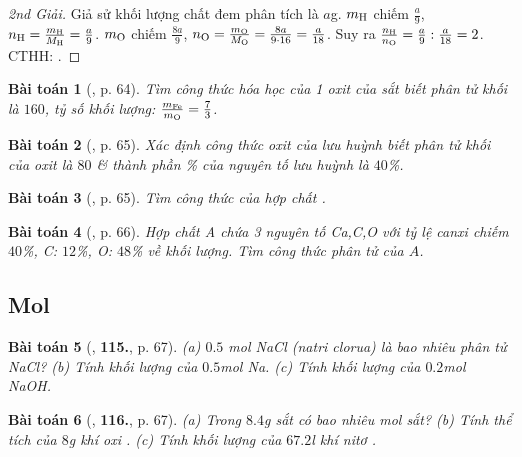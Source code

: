 \documentclass{article}
\numberwithin{equation}{section}
\newtheorem{baitoan}{Bài toán}
\begin{document}
\begin{proof}[2nd Giải]
	Giả sử khối lượng chất đem phân tích là $a$g. $m_{\rm H}$ chiếm $\frac{a}{9}$, $n_{\rm H} = \frac{m_{\rm H}}{M_{\rm H}} = \frac{a}{9}$. $m_{\rm O}$ chiếm $\frac{8a}{9}$, $n_{\rm O} = \frac{m_{\rm O}}{M_{\rm O}} = \frac{8a}{9\cdot16} = \frac{a}{18}$. Suy ra $\frac{n_{\rm H}}{n_{\rm O}} = \frac{a}{9}:\frac{a}{18} = 2$. CTHH: .
\end{proof}

\begin{baitoan}[\cite{An_400_BT_Hoa_Hoc_8_2020}, p. 64]
	Tìm công thức hóa học của 1 oxit của sắt biết phân tử khối là $160$, tỷ số khối lượng: $\frac{m_{\ce{Fe}}}{m_{\rm O}} = \frac{7}{3}$.
\end{baitoan}

\begin{baitoan}[\cite{An_400_BT_Hoa_Hoc_8_2020}, p. 65]
	Xác định công thức oxit của lưu huỳnh biết phân tử khối của oxit là $80$ \& thành phần \% của nguyên tố lưu huỳnh là $40$\%.
\end{baitoan}

\begin{baitoan}[\cite{An_400_BT_Hoa_Hoc_8_2020}, p. 65]
	Tìm công thức của hợp chất \emph{}.
\end{baitoan}

\begin{baitoan}[\cite{An_400_BT_Hoa_Hoc_8_2020}, p. 66]
	Hợp chất A chứa 3 nguyên tố \emph{Ca,C,O} với tỷ lệ canxi chiếm $40$\%, \emph{C}: $12$\%, \emph{O}: $48$\% về khối lượng. Tìm công thức phân tử của $A$.
\end{baitoan}

\subsection{Mol}

\begin{baitoan}[\cite{An_400_BT_Hoa_Hoc_8_2020}, \textbf{115.}, p. 67]
	(a) $0.5$ mol \emph{NaCl} (natri clorua) là bao nhiêu phân tử \emph{NaCl}? (b) Tính khối lượng của $0.5$\emph{mol} \emph{Na}. (c) Tính khối lượng của $0.2$\emph{mol} \emph{NaOH}.
\end{baitoan}

\begin{baitoan}[\cite{An_400_BT_Hoa_Hoc_8_2020}, \textbf{116.}, p. 67]
	(a) Trong $8.4$\emph{g} sắt có bao nhiêu mol sắt? (b) Tính thể tích của $8$\emph{g} khí oxi \emph{}. (c) Tính khối lượng của $67.2$\emph{l} khí nitơ \emph{}.
\end{baitoan}
\end{document}
